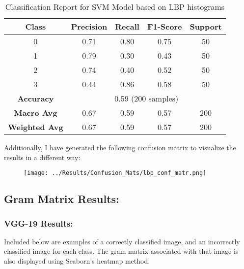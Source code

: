 \documentclass{article}
\begin{document}
\begin{table}[h!]
    \centering
    \begin{tabular}{|c|c|c|c|c|}
        \hline
        Class & Precision & Recall & F1-Score & Support \\
        \hline
        0 & 0.71 & 0.80 & 0.75 & 50 \\
        1 & 0.79 & 0.30 & 0.43 & 50 \\
        2 & 0.74 & 0.40 & 0.52 & 50 \\
        3 & 0.44 & 0.86 & 0.58 & 50 \\
        \hline
        \multicolumn{1}{|c|}{\textbf{Accuracy}} & \multicolumn{4}{c|}{0.59 (200 samples)} \\
        \hline
        \multicolumn{1}{|c|}{\textbf{Macro Avg}} & 0.67 & 0.59 & 0.57 & 200 \\
        \multicolumn{1}{|c|}{\textbf{Weighted Avg}} & 0.67 & 0.59 & 0.57 & 200 \\
        \hline
    \end{tabular}
    \caption{Classification Report for SVM Model based on LBP histograms}
    \label{tab:classification_report}
\end{table}

Additionally, I have generated the following confusion matrix to visualize the results in a different way:

\begin{figure}[H]
    \centering
    \texttt{[image: ../Results/Confusion\_Mats/lbp\_conf\_matr.png]}
    \label{fig:lbp-conf-mat}
\end{figure}

\subsection{Gram Matrix Results:}
\subsubsection{VGG-19 Results:}
Included below are examples of a correctly classified image, and an incorrectly classified image for each class. The gram matrix associated with that image is also displayed using Seaborn's heatmap method.
\end{document}
